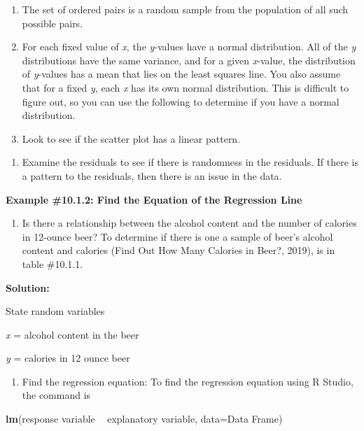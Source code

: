 \documentclass[
]{book}
\newenvironment{Shaded}{\begin{snugshade}}{\end{snugshade}}
\newcommand{\DataTypeTok}[1]{\textcolor[rgb]{0.13,0.29,0.53}{#1}}
\newcommand{\KeywordTok}[1]{\textcolor[rgb]{0.13,0.29,0.53}{\textbf{#1}}}
\newcommand{\NormalTok}[1]{#1}
\newcommand{\OperatorTok}[1]{\textcolor[rgb]{0.81,0.36,0.00}{\textbf{#1}}}
\newcommand{\StringTok}[1]{\textcolor[rgb]{0.31,0.60,0.02}{#1}}
\providecommand{\tightlist}{%
  \setlength{\itemsep}{0pt}\setlength{\parskip}{0pt}}
\begin{document}
\begin{enumerate}
\def\labelenumi{\alph{enumi}.}
\item
  The set of ordered pairs is a random sample from the population of all such possible pairs.
\item
  For each fixed value of \emph{x}, the \emph{y}-values have a normal distribution. All of the \emph{y} distributions have the same variance, and for a given \emph{x}-value, the distribution of \emph{y}-values has a mean that lies on the least squares line. You also assume that for a fixed \emph{y}, each \emph{x} has its own normal distribution. This is difficult to figure out, so you can use the following to determine if you have a normal distribution.
\item
  Look to see if the scatter plot has a linear pattern.
\end{enumerate}

\begin{enumerate}
\def\labelenumi{\roman{enumi}.}
\setcounter{enumi}{1}
\tightlist
\item
  Examine the residuals to see if there is randomness in the residuals. If there is a pattern to the residuals, then there is an issue in the data.
\end{enumerate}

\textbf{Example \#10.1.2: Find the Equation of the Regression Line}

\begin{enumerate}
\def\labelenumi{\alph{enumi}.}
\tightlist
\item
  Is there a relationship between the alcohol content and the number of calories in 12-ounce beer? To determine if there is one a sample of beer's alcohol content and calories (Find Out How Many Calories in Beer?, 2019), is in table \#10.1.1.
\end{enumerate}

\textbf{Solution:}

State random variables

\emph{x} = alcohol content in the beer

\emph{y} = calories in 12 ounce beer

\begin{enumerate}
\def\labelenumi{\alph{enumi}.}
\setcounter{enumi}{1}
\tightlist
\item
  Find the regression equation: To find the regression equation using R Studio, the command is
\end{enumerate}

\begin{Shaded}
\begin{Highlighting}[]
\KeywordTok{lm}\NormalTok{(response variable }\OperatorTok{~}\StringTok{ }\NormalTok{explanatory variable, }\DataTypeTok{data=}\NormalTok{Data Frame)}
\end{Highlighting}
\end{Shaded}
\end{document}
